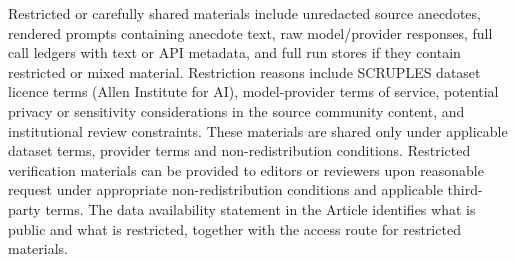 \documentclass[11pt]{article}
\begin{document}
Restricted or carefully shared materials include unredacted source anecdotes, rendered prompts containing anecdote text, raw model/provider responses, full call ledgers with text or API metadata, and full run stores if they contain restricted or mixed material. Restriction reasons include SCRUPLES dataset licence terms (Allen Institute for AI), model-provider terms of service, potential privacy or sensitivity considerations in the source community content, and institutional review constraints. These materials are shared only under applicable dataset terms, provider terms and non-redistribution conditions. Restricted verification materials can be provided to editors or reviewers upon reasonable request under appropriate non-redistribution conditions and applicable third-party terms. The data availability statement in the Article identifies what is public and what is restricted, together with the access route for restricted materials.
\end{document}
